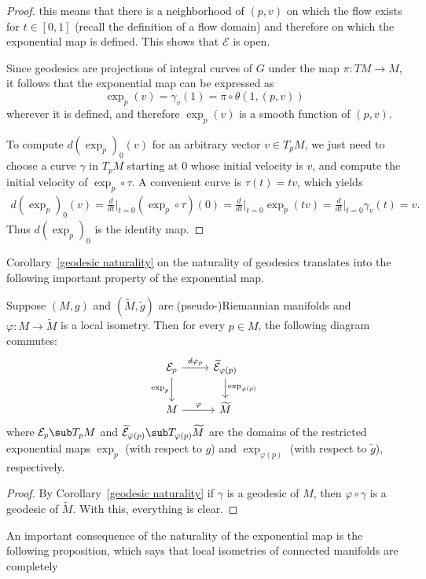 \begin{proof}
this means that there is a neighborhood of $(p,v)$ on which the flow exists for $t\in[0,1]$ (recall the definition of a flow domain) and therefore on which the 
exponential map is defined. This shows that $\mathcal{E}$ is open.\par
Since geodesics are projections of integral curves of $G$ under the map $\pi:TM\to M$, it follows that the exponential map can be expressed as
\[\exp_p(v)=\gamma_v(1)=\pi\circ\theta(1,(p,v))\]
wherever it is defined, and therefore $\exp_p(v)$ is a smooth function of $(p,v)$.\par
To compute $d(\exp_p)_0(v)$ for an arbitrary vector $v\in T_pM$, we just need to choose a curve $\gamma$ in $T_pM$ starting at $0$ whose initial velocity is $v$, and 
compute the initial velocity of $\exp_p\circ\tau$. A convenient curve is $\tau(t)=tv$, which yields
\begin{align*}
d(\exp_p)_0(v)=\frac{d}{dt}\Big|_{t=0}(\exp_p\circ\tau)(0)=\frac{d}{dt}\Big|_{t=0}\exp_p(tv)=\frac{d}{dt}\Big|_{t=0}\gamma_{v}(t)=v.
\end{align*}
Thus $d(\exp_p)_0$ is the identity map.
\end{proof}
Corollary~\ref{geodesic naturality} on the naturality of geodesics translates into the following important property of the exponential map.
\begin{proposition}
Suppose $(M,g)$ and $(\widetilde{M},\tilde{g})$ are (pseudo-)Riemannian manifolds and $\varphi:M\to\widetilde{M}$ is a local isometry. Then for every 
$p\in M$, the following diagram commutes:
\[\begin{tikzcd}
\mathcal{E}_p\ar[r,"d\varphi_p"]\ar[d,swap,"\exp_p"]&\widetilde{\mathcal{E}}_{\varphi(p)}\ar[d,"\exp_{\varphi(p)}"]\\
M\ar[r,"\varphi"]&\widetilde{M}
\end{tikzcd}\]
where $\mathcal{E}_p\sub T_pM$ and $\widetilde{\mathcal{E}}_{\varphi(p)}\sub T_{\varphi(p)}\widetilde{M}$ are the domains of the restricted exponential maps 
$\exp_p$ (with respect to $g$) and $\exp_{\varphi(p)}$ (with respect to $\tilde{g}$), respectively.
\end{proposition}
\begin{proof}
By Corollary~\ref{geodesic naturality} if $\gamma$ is a geodesic of $M$, then $\varphi\circ\gamma$ is a geodesic of $\widetilde{M}$. With this, everything is clear.
\end{proof}
An important consequence of the naturality of the exponential map is the following proposition, which says that local isometries of connected manifolds are completely 
